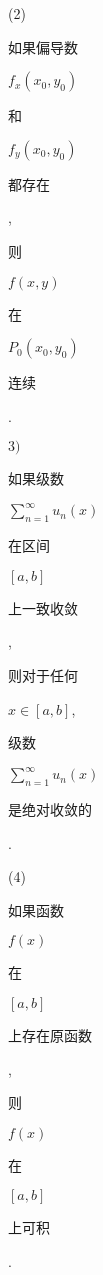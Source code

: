 \documentclass[10pt]{article}
\begin{document}
(2) \begin{CJK}{UTF8}{mj}如果偏导数\end{CJK} $f_{x}\left(x_{0}, y_{0}\right)$ \begin{CJK}{UTF8}{mj}和\end{CJK} $f_{y}\left(x_{0}, y_{0}\right)$ \begin{CJK}{UTF8}{mj}都存在\end{CJK}, \begin{CJK}{UTF8}{mj}则\end{CJK} $f(x, y)$ \begin{CJK}{UTF8}{mj}在\end{CJK} $P_{0}\left(x_{0}, y_{0}\right)$ \begin{CJK}{UTF8}{mj}连续\end{CJK}.

$3)$ \begin{CJK}{UTF8}{mj}如果级数\end{CJK} $\sum_{n=1}^{\infty} u_{n}(x)$ \begin{CJK}{UTF8}{mj}在区间\end{CJK} $[a, b]$ \begin{CJK}{UTF8}{mj}上一致收敛\end{CJK}, \begin{CJK}{UTF8}{mj}则对于任何\end{CJK} $x \in[a, b]$, \begin{CJK}{UTF8}{mj}级数\end{CJK} $\sum_{n=1}^{\infty} u_{n}(x)$ \begin{CJK}{UTF8}{mj}是绝对收敛的\end{CJK}.

(4) \begin{CJK}{UTF8}{mj}如果函数\end{CJK} $f(x)$ \begin{CJK}{UTF8}{mj}在\end{CJK} $[a, b]$ \begin{CJK}{UTF8}{mj}上存在原函数\end{CJK}, \begin{CJK}{UTF8}{mj}则\end{CJK} $f(x)$ \begin{CJK}{UTF8}{mj}在\end{CJK} $[a, b]$ \begin{CJK}{UTF8}{mj}上可积\end{CJK}.
\end{document}
